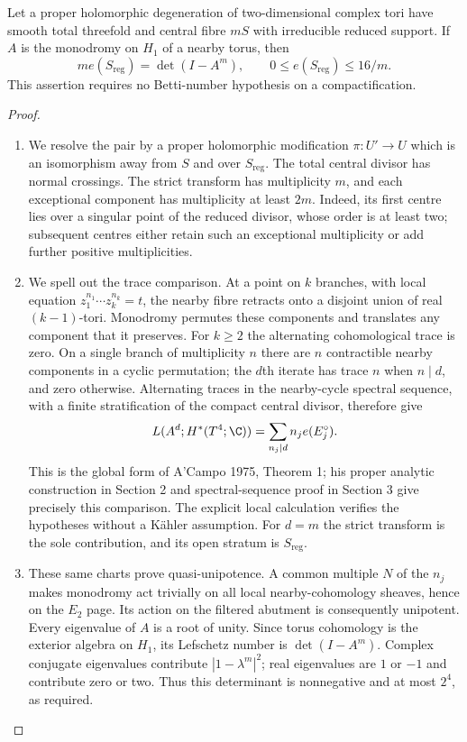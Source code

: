 \begin{proposition}[P4.13]\hypertarget{tag-02WK}{}\label{night:P4.13}\label{stmt:P4.13}

Let a proper holomorphic degeneration of two-dimensional complex
tori have smooth total threefold and central fibre $mS$ with
irreducible reduced support. If $A$ is the monodromy on $H_1$ of
a nearby torus, then
\[
 m e(S_{\mathrm{reg}})=\det(I-A^m),\qquad
 0\le e(S_{\mathrm{reg}})\le16/m.
\]
This assertion requires no Betti-number hypothesis on a compactification.
\end{proposition}
\begin{proof}

\begin{enumerate}[label={$\langle1\rangle$\arabic*.},leftmargin=*]
\item We resolve the pair by a proper holomorphic modification
$\pi:U'\to U$ which is an isomorphism away from $S$ and over
$S_{\mathrm{reg}}$. The total central divisor has normal crossings.
The strict transform has multiplicity $m$, and each exceptional
component has multiplicity at least $2m$. Indeed, its first centre
lies over a singular point of the reduced divisor, whose order is
at least two; subsequent centres either retain such an exceptional
multiplicity or add further positive multiplicities.

\item We spell out the trace comparison. At a point on $k$ branches,
with local equation $z_1^{n_1}\cdots z_k^{n_k}=t$, the nearby
fibre retracts onto a disjoint union of real $(k-1)$-tori.
Monodromy permutes these components and translates any component
that it preserves. For $k\ge2$ the alternating cohomological
trace is zero. On a single branch of multiplicity $n$ there are
$n$ contractible nearby components in a cyclic permutation;
the $d$th iterate has trace $n$ when $n\mid d$, and zero otherwise.
Alternating traces in the nearby-cycle spectral sequence, with a
finite stratification of the compact central divisor, therefore give
\[
 L(A^d;H^*(T^4;\C))=\sum_{n_j\mid d}n_j e(E_j^\circ).
\]
This is the global form of A'Campo 1975, Theorem 1; his proper
analytic construction in Section 2 and spectral-sequence proof in
Section 3 give precisely this comparison. The explicit local
calculation verifies the hypotheses without a Kähler assumption.
For $d=m$ the strict transform is the sole contribution, and its
open stratum is $S_{\mathrm{reg}}$.

\item These same charts prove quasi-unipotence. A common multiple $N$
of the $n_j$ makes monodromy act trivially on all local
nearby-cohomology sheaves, hence on the $E_2$ page. Its action
on the filtered abutment is consequently unipotent. Every
eigenvalue of $A$ is a root of unity. Since torus cohomology is
the exterior algebra on $H_1$, its Lefschetz number is
$\det(I-A^m)$. Complex conjugate eigenvalues contribute
$|1-\lambda^m|^2$; real eigenvalues are $1$ or $-1$ and
contribute zero or two. Thus this determinant is nonnegative
and at most $2^4$, as required.

\end{enumerate}
\end{proof}